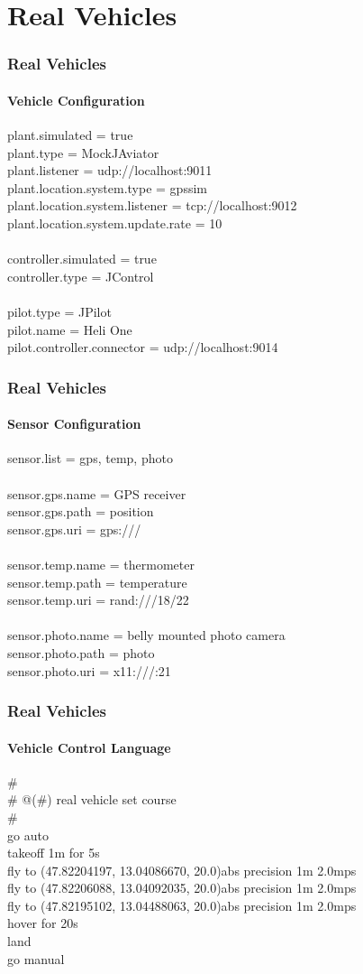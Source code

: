 \documentclass{beamer}
\begin{document}
\section{Real Vehicles}
\begin{frame}\frametitle{Real Vehicles}\framesubtitle{Vehicle Configuration}
plant.simulated = true \\
plant.type = MockJAviator \\
plant.listener = udp://localhost:9011 \\
plant.location.system.type = gpssim \\
plant.location.system.listener = tcp://localhost:9012 \\
plant.location.system.update.rate = 10 \\
\quad \\
controller.simulated = true \\
controller.type = JControl \\
\quad \\
pilot.type = JPilot \\
pilot.name = Heli One \\
pilot.controller.connector = udp://localhost:9014
\end{frame}


\begin{frame}\frametitle{Real Vehicles}\framesubtitle{Sensor Configuration}
sensor.list = gps, temp, photo \\
\quad \\
sensor.gps.name = GPS receiver \\
sensor.gps.path = position \\
sensor.gps.uri = gps:/// \\
\quad \\
sensor.temp.name = thermometer \\
sensor.temp.path = temperature \\
sensor.temp.uri = rand:///18/22 \\
\quad \\
sensor.photo.name = belly mounted photo camera \\
sensor.photo.path = photo \\
sensor.photo.uri = x11:///:21
\end{frame}


\begin{frame}\frametitle{Real Vehicles}\framesubtitle{Vehicle Control Language}
\# \\
\# @(\#) real vehicle set course \\
\# \\
go auto \\
takeoff 1m for 5s \\
fly to (47.82204197, 13.04086670, 20.0)abs precision 1m 2.0mps \\
fly to (47.82206088, 13.04092035, 20.0)abs precision 1m 2.0mps \\
fly to (47.82195102, 13.04488063, 20.0)abs precision 1m 2.0mps \\
hover for 20s \\
land \\
go manual
\end{frame}
\end{document}
